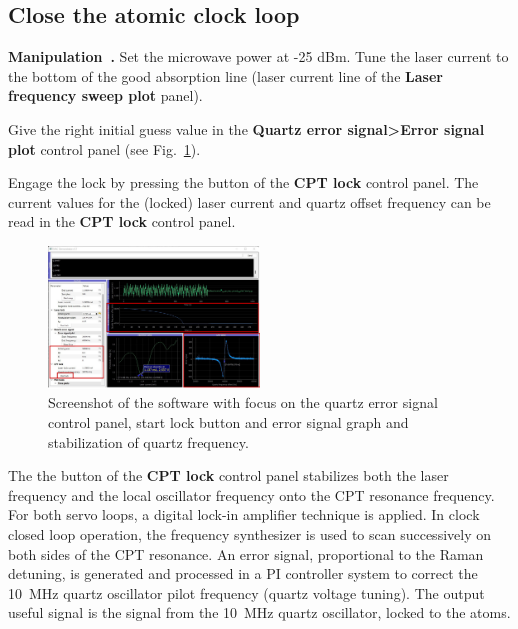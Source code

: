 \documentclass[a4paper,11pt]{article}
\newcounter{manip}
\newenvironment{manip}[1][]{\refstepcounter{manip}\par\medskip
	\textbf{Manipulation~\themanip. #1} \rmfamily }{\medskip}
\begin{document}
\subsection{Close the atomic clock loop}

\begin{manip}
Set the microwave power at -25 dBm.
Tune the laser current to the bottom of the good absorption line (\textsf{laser current} line of the \textbf{\textsf{Laser frequency sweep plot}} panel).

Give the right \textsf{initial guess} value in the \textbf{\textsf{Quartz error signal>Error signal plot}} control panel (see Fig.~\ref{fig:start-lock}).

Engage the lock by pressing the  button of the \textbf{\textsf{CPT lock}} control panel.
The current values for the (locked) laser current and quartz offset frequency can be read in the \textbf{\textsf{CPT lock}} control panel.


\end{manip}

\begin{figure}[!h] %
\centering
\includegraphics[width=0.5\textwidth]{Images/start-lock.pdf}
\captionsetup{justification=centering}
\caption{Screenshot of the software with focus on the quartz error signal control panel, start lock button and error signal graph and stabilization of quartz frequency.}
\label{fig:start-lock}
\end{figure}

The the  button of the \textbf{\textsf{CPT lock}} control panel stabilizes both the laser frequency and the local oscillator frequency onto the CPT resonance frequency. For both servo loops, a digital lock-in amplifier technique is applied. In clock closed loop operation, the frequency synthesizer is used to scan successively on both sides of the CPT resonance. An error signal, proportional to the Raman detuning, is generated and processed in a PI controller system to correct the 10~MHz quartz oscillator pilot frequency (quartz voltage tuning). The output useful signal is the signal from the 10~MHz quartz oscillator, locked to the atoms.
\end{document}
